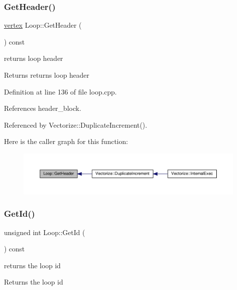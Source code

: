 \subsubsection{\texorpdfstring{Get\+Header()}{GetHeader()}}
{\footnotesize\ttfamily \hyperlink{graph_8hpp_abefdcf0544e601805af44eca032cca14}{vertex} Loop\+::\+Get\+Header (\begin{DoxyParamCaption}{ }\end{DoxyParamCaption}) const}



returns loop header 

\begin{DoxyReturn}{Returns}
returns loop header 
\end{DoxyReturn}


Definition at line 136 of file loop.\+cpp.



References header\+\_\+block.



Referenced by Vectorize\+::\+Duplicate\+Increment().

Here is the caller graph for this function\+:
\nopagebreak
\begin{figure}[H]
\begin{center}
\leavevmode
\includegraphics[width=350pt]{de/d77/classLoop_ada724b948e80a1e01ea8f69bd240d2f9_icgraph}
\end{center}
\end{figure}
\mbox{\label{classLoop_a2f959c9a7f38a30159bf6448bc093f58}} 
\subsubsection{\texorpdfstring{Get\+Id()}{GetId()}}
{\footnotesize\ttfamily unsigned int Loop\+::\+Get\+Id (\begin{DoxyParamCaption}{ }\end{DoxyParamCaption}) const}



returns the loop id 

\begin{DoxyReturn}{Returns}
the loop id 
\end{DoxyReturn}


